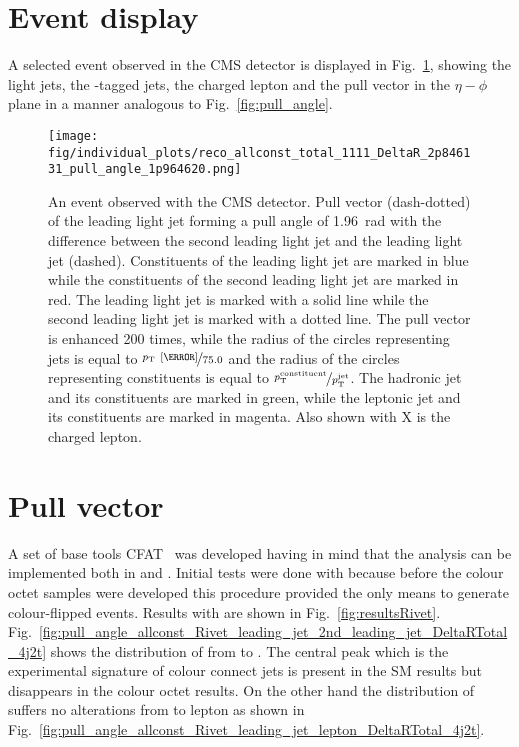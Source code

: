 \section{Event display}
A selected event observed in the CMS detector is displayed in Fig.~\ref{fig:event_display}, showing the light jets, the \cPqb-tagged jets, the charged lepton and the pull vector in the $\eta-\phi$ plane in a manner analogous to Fig.~\ref{fig:pull_angle}.

\begin{figure}[hbtp]
  \centering
  \texttt{[image: fig/individual\_plots/reco\_allconst\_total\_1111\_DeltaR\_2p846131\_pull\_angle\_1p964620.png]}
  \caption{An event observed with the CMS detector. Pull vector (dash-dotted) of the leading light jet forming a pull angle of 1.96~rad with the difference between the second leading light jet and the leading light jet (dashed). Constituents of the leading light jet are marked in blue while the constituents of the second leading light jet are marked in red. The leading light jet is marked with a solid line while the second leading light jet is marked with a dotted line. The pull vector is enhanced 200 times, while the radius of the circles representing jets is equal to $\nicefrac{p_{\text{T}}~[\GeV]}{75.0}$ and the radius of the circles representing constituents is equal to $\nicefrac{p^{\text{constituent}}_{\text{T}}}{p^{\text{jet}}_{\text{T}}}$. The hadronic \cPqb jet and its constituents are marked in green, while the leptonic \cPqb jet and its constituents are marked in magenta. Also shown with X is the charged lepton.}
  \label{fig:event_display}
\end{figure}

\section{Pull vector}

A set of base tools \textsc{CFAT}~\cite{url:cfat} was developed having in mind that the analysis can be implemented both in \RIVET and \CMSSW. Initial tests were done with \RIVET because before the colour octet \PW samples were developed this procedure provided the only means to generate colour-flipped events. Results with \RIVET are shown in Fig.~\ref{fig:resultsRivet}. Fig.~\ref{fig:pull_angle_allconst_Rivet_leading_jet_2nd_leading_jet_DeltaRTotal_4j2t} shows the distribution of \pullangle from \leadingjet to \scndleadingjet. The central peak which is the experimental signature of colour connect jets is present in the SM results but disappears in the \PW colour octet results. On the other hand the distribution of \pullangle suffers no alterations from \leadingjet to lepton as shown in Fig.~\ref{fig:pull_angle_allconst_Rivet_leading_jet_lepton_DeltaRTotal_4j2t}.

